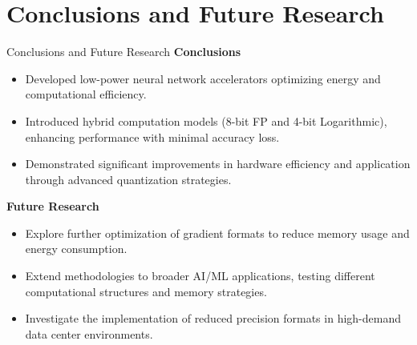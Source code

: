 \section{Conclusions and Future Research}
\tableofcontents[currentsection]
	\begin{frame}{Conclusions and Future Research}
		\textbf{Conclusions}
		\begin{itemize}
			\item<1-> Developed low-power neural network accelerators optimizing energy and computational efficiency.
			\item<2-> Introduced hybrid computation models (8-bit FP and 4-bit Logarithmic), enhancing performance with minimal accuracy loss.
			\item<3-> Demonstrated significant improvements in hardware efficiency and application through advanced quantization strategies.
		\end{itemize}
		
		\pause[4] %
		
		\textbf{Future Research}
		\begin{itemize}
			\item<4-> Explore further optimization of gradient formats to reduce memory usage and energy consumption.
			\item<5-> Extend methodologies to broader AI/ML applications, testing different computational structures and memory strategies.
			\item<6-> Investigate the implementation of reduced precision formats in high-demand data center environments.
		\end{itemize}
	\end{frame}
